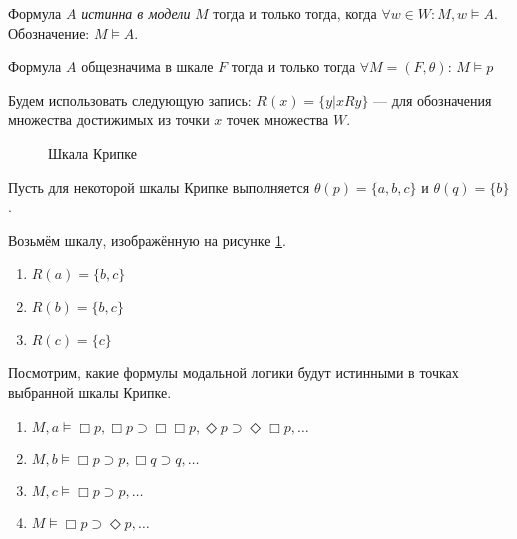 \begin{definition}
    Формула $A$ \textit{истинна в модели} $M$ тогда и только тогда, когда $\forall w \in W: M,w \models A$.
    Обозначение: $M \models A$.
\end{definition}
\begin{definition}
    Формула $A$ общезначима в шкале $F$ тогда и только тогда $\forall M = (F, \theta)$:
    $M \models p$
\end{definition}

\begin{remark}
    Будем использовать следующую запись: $R(x) = \{y | xRy \}$ --- для обозначения множества достижимых из точки $x$ точек множества $W$.
\end{remark}

\begin{figure}[ht]
\begin{center}
\end{center}
\caption{Шкала Крипке}
\label{Picture:KripkeExample1}
\end{figure}

\begin{example}
    Пусть для некоторой шкалы Крипке выполняется $\theta(p) = \{ a, b, c \}$ и $\theta(q) = \{ b \}$.

    Возьмём шкалу, изображённую на рисунке \ref{Picture:KripkeExample1}.
    \begin{enumerate}
        \item $R(a) = \{b, c\}$
        \item $R(b) = \{b, c\}$
        \item $R(c) = \{c\}$
    \end{enumerate}


    Посмотрим, какие формулы модальной логики будут истинными в точках выбранной шкалы Крипке.

    \begin{enumerate}
        \item $M, a \models \Box p, \Box p \supset \Box \Box p, \Diamond p
            \supset \Diamond \Box p, \dots $
        \item $M, b \models \Box p \supset p, \Box q \supset q, \dots$
        \item $M, c \models \Box p \supset p, \dots$
        \item $M \models \Box p \supset \Diamond p, \dots$
    \end{enumerate}
\end{example}

